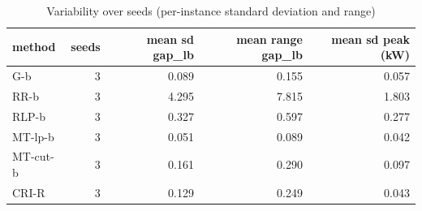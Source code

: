 \begin{table}[htbp]
\centering
\small
\caption{Variability over seeds (per-instance standard deviation and range)}
\label{tab:E2b_head_to_head_budgets_b1_seeds}
\begin{tabular}{lrrrr}
\toprule
method & seeds & mean sd gap\_lb & mean range gap\_lb & mean sd peak (kW) \\
\midrule
G-b & 3 & 0.089 & 0.155 & 0.057 \\
RR-b & 3 & 4.295 & 7.815 & 1.803 \\
RLP-b & 3 & 0.327 & 0.597 & 0.277 \\
MT-lp-b & 3 & 0.051 & 0.089 & 0.042 \\
MT-cut-b & 3 & 0.161 & 0.290 & 0.097 \\
CRI-R & 3 & 0.129 & 0.249 & 0.043 \\
\bottomrule
\end{tabular}
\end{table}
